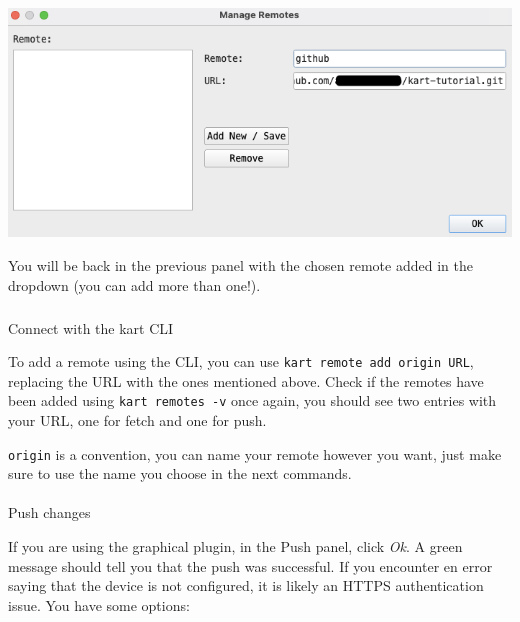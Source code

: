\documentclass[
  letterpaper,
  DIV=11,
  numbers=noendperiod]{scrartcl}
\makeatletter
\let\oldparagraph\paragraph
\renewcommand{\paragraph}{
    \@ifstar
      \xxxParagraphStar
      \xxxParagraphNoStar
  }
\newcommand{\xxxParagraphStar}[1]{\oldparagraph*{#1}\mbox{}}
\newcommand{\xxxParagraphNoStar}[1]{\oldparagraph{#1}\mbox{}}
\let\oldsubparagraph\subparagraph
\renewcommand{\subparagraph}{
    \@ifstar
      \xxxSubParagraphStar
      \xxxSubParagraphNoStar
  }
\newcommand{\xxxSubParagraphStar}[1]{\oldsubparagraph*{#1}\mbox{}}
\newcommand{\xxxSubParagraphNoStar}[1]{\oldsubparagraph{#1}\mbox{}}
\makeatother
\begin{document}
\begin{center}
\includegraphics{img/kart-panel-remotes-add.png}
\end{center}

You will be back in the previous panel with the chosen remote added in
the dropdown (you can add more than one!).

\subparagraph{Connect with the kart
CLI}\label{connect-with-the-kart-cli}

To add a remote using the CLI, you can use
\texttt{kart\ remote\ add\ origin\ URL}, replacing the URL with the ones
mentioned above. Check if the remotes have been added using
\texttt{kart\ remotes\ -v} once again, you should see two entries with
your URL, one for fetch and one for push.

\begin{tcolorbox}[enhanced jigsaw, colframe=quarto-callout-note-color-frame, colbacktitle=quarto-callout-note-color!10!white, rightrule=.15mm, opacitybacktitle=0.6, opacityback=0, bottomrule=.15mm, coltitle=black, title=\textcolor{quarto-callout-note-color}{\faInfo}\hspace{0.5em}{Note}, left=2mm, bottomtitle=1mm, toptitle=1mm, toprule=.15mm, breakable, titlerule=0mm, colback=white, leftrule=.75mm, arc=.35mm]

\texttt{origin} is a convention, you can name your remote however you
want, just make sure to use the name you choose in the next commands.

\end{tcolorbox}

\paragraph{Push changes}\label{push-changes}

If you are using the graphical plugin, in the Push panel, click
\emph{Ok}. A green message should tell you that the push was successful.
If you encounter en error saying that the device is not configured, it
is likely an HTTPS authentication issue. You have some options:
\end{document}
